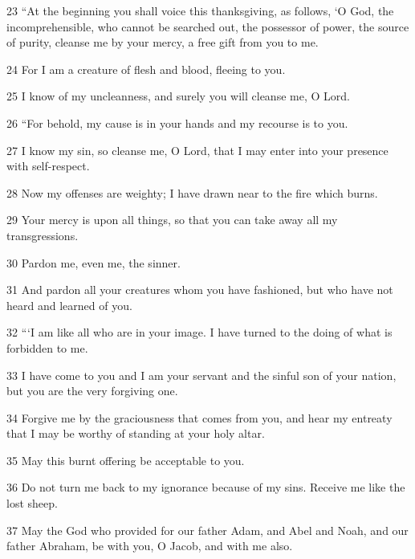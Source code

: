 \par 23 “At the beginning you shall voice this thanksgiving, as follows, ‘O God, the incomprehensible, who cannot be searched out, the possessor of power, the source of purity, cleanse me by your mercy, a free gift from you to me. 

\par 24 For I am a creature of flesh and blood, fleeing to you. 

\par 25 I know of my uncleanness, and surely you will cleanse me, O Lord. 

\par 26 “For behold, my cause is in your hands and my recourse is to you. 

\par 27 I know my sin, so cleanse me, O Lord, that I may enter into your presence with self-respect. 

\par 28 Now my offenses are weighty; I have drawn near to the fire which burns. 

\par 29 Your mercy is upon all things, so that you can take away all my transgressions. 

\par 30 Pardon me, even me, the sinner. 

\par 31 And pardon all your creatures whom you have fashioned, but who have not heard and learned of you.

\par 32 “‘I am like all who are in your image. I have turned to the doing of what is forbidden to me. 

\par 33 I have come to you and I am your servant and the sinful son of your nation, but you are the very forgiving one. 

\par 34 Forgive me by the graciousness that comes from you, and hear my entreaty that I may be worthy of standing at your holy altar. 

\par 35 May this burnt offering be acceptable to you. 

\par 36 Do not turn me back to my ignorance because of my sins. Receive me like the lost sheep. 

\par 37 May the God who provided for our father Adam, and Abel and Noah, and our father Abraham, be with you, O Jacob, and with me also. 

